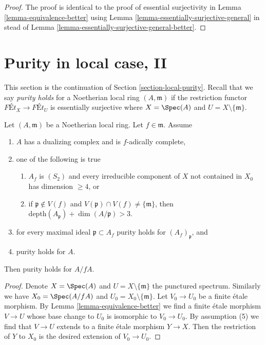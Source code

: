 \begin{proof}
The proof is identical to the proof of essential surjectivity in
Lemma \ref{lemma-equivalence-better}
using
Lemma \ref{lemma-essentially-surjective-general}
in stead of
Lemma \ref{lemma-essentially-surjective-general-better}.
\end{proof}



\section{Purity in local case, II}
\label{section-local-purity-II}

\noindent
This section is the continuation of Section \ref{section-local-purity}.
Recall that we say {\it purity holds} for a Noetherian local ring
$(A, \mathfrak m)$ if the restriction functor
$\textit{F\'Et}_X \to \textit{F\'Et}_U$ is essentially
surjective where $X = \Spec(A)$ and $U = X \setminus \{\mathfrak m\}$.

\begin{lemma}
\label{lemma-purity-inherited-by-hypersurface-better}
Let $(A, \mathfrak m)$ be a Noetherian local ring.
Let $f \in \mathfrak m$. Assume
\begin{enumerate}
\item $A$ has a dualizing complex and is $f$-adically complete,
\item one of the following is true
\begin{enumerate}
\item $A_f$ is $(S_2)$ and every irreducible component of $X$
not contained in $X_0$ has dimension $\geq 4$, or
\item if $\mathfrak p \not \in V(f)$ and
$V(\mathfrak p) \cap V(f) \not = \{\mathfrak m\}$, then
$\text{depth}(A_\mathfrak p) + \dim(A/\mathfrak p) > 3$.
\end{enumerate}
\item for every maximal ideal $\mathfrak p \subset A_f$
purity holds for $(A_f)_\mathfrak p$, and
\item purity holds for $A$.
\end{enumerate}
Then purity holds for $A/fA$.
\end{lemma}

\begin{proof}
Denote $X = \Spec(A)$ and $U = X \setminus \{\mathfrak m\}$
the punctured spectrum. Similarly we have $X_0 = \Spec(A/fA)$
and $U_0 = X_0 \setminus \{\mathfrak m\}$.
Let $V_0 \to U_0$ be a finite \'etale morphism. By
Lemma \ref{lemma-equivalence-better}
we find a finite \'etale morphism $V \to U$
whose base change to $U_0$
is isomorphic to $V_0 \to U_0$.
By assumption (5) we find that $V \to U$ extends
to a finite \'etale morphism $Y \to X$. Then the restriction of
$Y$ to $X_0$ is the desired extension of $V_0 \to U_0$.
\end{proof}

